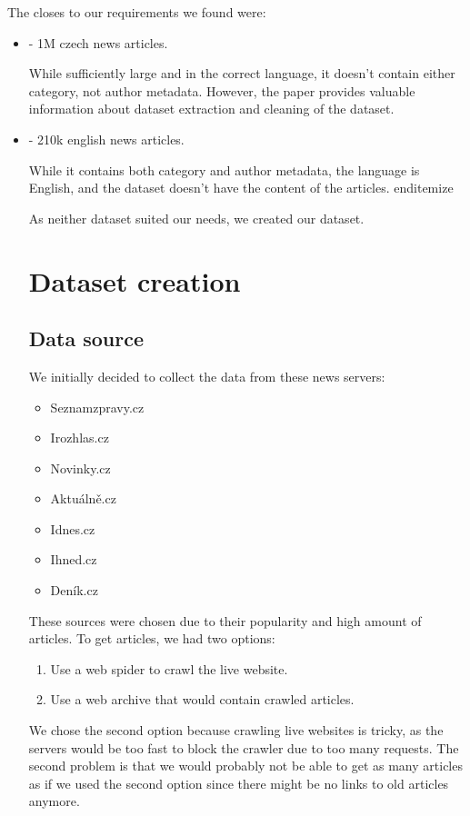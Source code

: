 The closes to our requirements we found were:
\begin{itemize}
    \item \cite{strakaSumeCzechLargeCzech2018a} - 1M czech news articles.

        While sufficiently large and in the correct language, 
        it doesn't contain either category, not author metadata. 
        However, the paper provides valuable information about dataset extraction
        and cleaning of the dataset.
    \item \cite{misraNewsCategoryDataset2022} - 210k english news articles.

        While it contains both category and author metadata,
        the language is English, and the dataset doesn't have the content of the articles.
end{itemize}

As neither dataset suited our needs, we created our dataset.


\section{Dataset creation}
\label{sec:dataset-creation}

\subsection{Data source}
We initially decided to collect the data from these news servers:
\begin{itemize}
    \item Seznamzpravy.cz
    \item Irozhlas.cz
    \item Novinky.cz
    \item Aktuálně.cz
    \item Idnes.cz
    \item Ihned.cz
    \item Deník.cz
\end{itemize}

These sources were chosen due to their popularity and high amount of articles.
To get articles, we had two options:
\begin{enumerate}
    \item Use a web spider to crawl the live website.
    \item Use a web archive that would contain crawled articles.
\end{enumerate}
We chose the second option because crawling live websites is tricky,
as the servers would be too fast to block the crawler due to too many requests.
The second problem is that we would probably not be able to get as many articles as
if we used the second option since there might be no links to old articles anymore.


\end{itemize}
